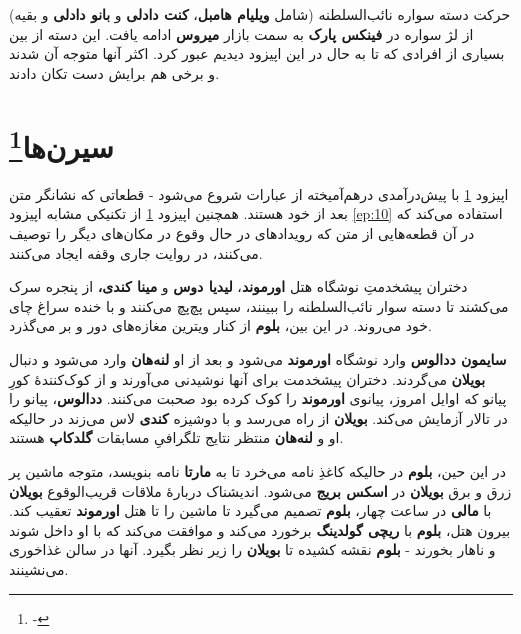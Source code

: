 \documentclass[12pt]{book}
\newcommand{\noun}[1]{{\textbf{#1}}}
\begin{document}
    حرکت دسته سواره نائب‌السلطنه (شامل \noun{ویلیام هامبل}، \noun{کنت دادلی} و \noun{بانو دادلی} و بقیه) از لژ سواره در \noun{فینکس پارک} به سمت بازار \noun{میروس} ادامه یافت. این دسته از بین بسیاری از افرادی که تا به حال در این اپیزود دیدیم عبور کرد. اکثر آنها متوجه آن شدند و برخی هم برایش دست تکان دادند.

    \chapter[سیرن‌ها]{سیرن‌ها\protect\footnote{-}}\label{ep:11}
    اپیزود \ref{ep:11} با پیش‌درآمدی درهم‌آمیخته از عبارات شروع می‌شود - قطعاتی که نشانگر متن بعد از خود هستند. همچنین اپیزود \ref{ep:11} از تکنیکی مشابه اپیزود \ref{ep:10} استفاده می‌کند که در آن قطعه‌هایی از متن که رویدادهای در حال وقوع در مکان‌های دیگر را توصیف می‌کنند، در روایت جاری وقفه ایجاد می‌کنند.

    دختران پیشخدمتِ نوشگاه هتل \noun{اورموند}، \noun{لیدیا دوس} و \noun{مینا کندی،} از پنجره سرک می‌کشند تا دسته سوار نائب‌السلطنه را ببینند، سپس پچ‌پچ می‌کنند و با خنده سراغ چای خود می‌روند. در این بین، \noun{بلوم} از کنار ویترین مغازه‌های دور و بر می‌گذرد.

    \noun{سایمون ددالوس‬} وارد نوشگاه \noun{اورموند} می‌شود و بعد از او \noun{لنه‌هان} وارد می‌شود و دنبال \noun{بویلان} می‌گردند. دختران پیشخدمت برای آنها نوشیدنی می‌آورند و از کوک‌کنندهٔ کورِ پیانو که اوایل امروز، پیانوی \noun{اورموند} را کوک کرده بود صحبت می‌کنند. \noun{ددالوس}، پیانو را در تالار آزمایش می‌کند. \noun{بویلان} از راه می‌رسد و با دوشیزه \noun{کندی} لاس می‌زند در حالیکه او و \noun{لنه‌هان} منتظر نتایج تلگرافیِ مسابقات \noun{گلدکاپ} هستند.

    در این حین، \noun{بلوم} در حالیکه کاغذِ نامه می‌خرد تا به \noun{مارتا} نامه بنویسد، متوجه ماشین پر زرق و برق \noun{بویلان} در \noun{اسکس بریج} می‌شود. اندیشناک دربارهٔ ملاقات قریب‌الوقوع \noun{بویلان} با \noun{مالی} در ساعت چهار، \noun{بلوم} تصمیم می‌گیرد تا ماشین را تا هتل \noun{اورموند} تعقیب کند. بیرون هتل، \noun{بلوم} با \noun{ریچی گولدینگ} برخورد می‌کند و موافقت می‌کند که با او داخل شوند و ناهار بخورند - \noun{بلوم} نقشه کشیده تا \noun{بویلان} را زیر نظر بگیرد. آنها در سالن غذاخوری می‌نشینند.
\end{document}
